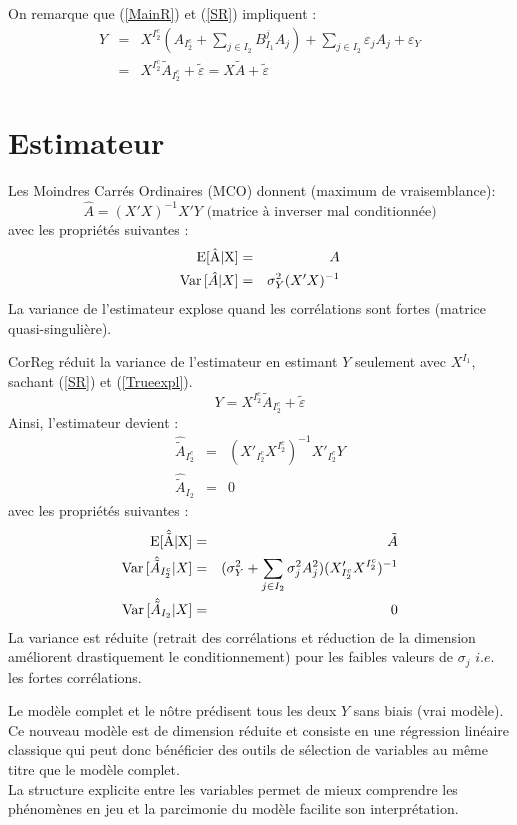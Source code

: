 \documentclass[12pt]{article}
\begin{document}
On remarque que (\ref{MainR}) et (\ref{SR}) impliquent :
\begin{eqnarray}
	Y&=&X^{I_2^c} (A_{I_2^c}+ \sum_{j \in I_2}B^{j}_{I_1}A_{j})+  \sum_{j \in I_2}\varepsilon_{j}A_{j}+\varepsilon_Y \\
					&=& X^{I_2^c}\tilde{A}_{I_2^c}+ \tilde{\varepsilon}=X\tilde{A}+ \tilde{\varepsilon}\label{Trueexpl} 			
\end{eqnarray}
\section{Estimateur}
	Les Moindres Carrés Ordinaires (MCO) donnent (maximum de vraisemblance): 
		\begin{equation}
			\hat A = (X'X)^{-1}X'Y \textrm{ (matrice à inverser mal conditionnée)}
		\end{equation}
		avec les propriétés suivantes :
		\begin{eqnarray}
			\rm{E}[\hat{A}|X]&=&A \\
			{\rm Var}\,[\hat{A}|X]&=& \sigma_Y^2(X'X)^{-1}
		\end{eqnarray}				
		La variance de l'estimateur explose quand les corrélations sont fortes (matrice quasi-singulière).
 			
		CorReg réduit la variance de l'estimateur en estimant $Y$ seulement avec $X^{I_1}$, sachant (\ref{SR}) et (\ref{Trueexpl}).
			\begin{equation}
				Y= X^{I_2^c}\tilde{A}_{I_2^c}+ \tilde{\varepsilon}\label{explicatif}
			\end{equation}							
		Ainsi, l'estimateur devient : 
		\begin{eqnarray}
			\hat{\tilde{A}}_{I_2^c} &=& (X'_{I_2^c} X^{I_2^c})^{-1}X'_{I_2^c}Y \\
			\hat{\tilde{A}}_{I_2} &=& 0
		\end{eqnarray}
		avec les propriétés suivantes :
		\begin{eqnarray}
			\rm{E}[\hat{\tilde{A}}|X]&=&\tilde{A} \\
			{\rm Var}\,[\hat{\tilde{A}}_{I_2^c}|X]&=& (\sigma^2_Y+\sum_{j \in I_2}\sigma^2_{j}A_{j}^2 )(X'_{I_2^c} X^{I_2^c})^{-1} \\
			{\rm Var}\,[\hat{\tilde{A}}_{I_2}|X]&=& 0 
		\end{eqnarray}
		La variance est réduite (retrait des corrélations et réduction de la dimension améliorent drastiquement le conditionnement) pour les faibles valeurs de $\sigma_j$ $i.e.$ les fortes corrélations.					
		
		Le modèle complet et le nôtre prédisent tous les deux $Y$ sans biais (vrai modèle)\cite{saporta2006probabilites}.
	\\	
	Ce nouveau modèle est de dimension réduite et consiste en une régression linéaire classique qui peut donc bénéficier des outils de sélection de variables au même titre que le modèle complet.			
		 \\		
		 La structure explicite entre les variables permet de mieux comprendre les phénomènes en jeu et la parcimonie du modèle facilite son interprétation.		
\end{document}
